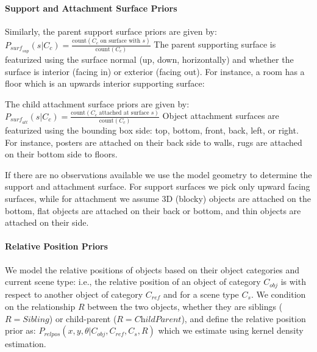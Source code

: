 \documentclass{sigchi}
\begin{document}
\paragraph{Support and Attachment Surface Priors}
Similarly, the parent support surface priors are given by: $P_{\textit{surf}_\textit{sup}}(s | C_c) = \frac{\text{count}(C_c \text{~on surface with~} s)}{\text{count}(C_c)}$
The parent supporting surface is featurized using the surface normal (up, down, horizontally) and whether the surface is interior (facing in) or exterior (facing out).  For instance, a room has a floor which is an upwards interior supporting surface: %

The child attachment surface priors are given by: $P_{\textit{surf}_\textit{att}}(s | C_c) = \frac{\text{count}(C_c \text{~attached at surface~} s)}{\text{count}(C_c)}$
Object attachment surfaces are featurized using the bounding box side: top, bottom, front, back, left, or right.  For instance, posters are attached on their back side to walls, rugs are attached on their bottom side to floors.

If there are no observations available we use the model geometry to determine the support and attachment surface. For support surfaces we pick only upward facing surfaces, while for attachment we assume 3D (blocky) objects are attached on the bottom, flat objects are attached on their back or bottom, and thin objects are attached on their side.

\paragraph{Relative Position Priors}
We model the relative positions of objects based on their object categories and current scene type: i.e., the relative position of an object of category $C_\textit{obj}$ is with respect to another object of category $C_\textit{ref}$ and for a scene type $C_{s}$.  We condition on the relationship $R$ between the two objects, whether they are siblings ($R=\textit{Sibling}$) or child-parent ($R=\textit{ChildParent}$), and define the relative position prior as: $P_\textit{relpos}( x,y,\theta | C_\textit{obj}, C_\textit{ref}, C_{s}, R )$ which we estimate using kernel density estimation.
\end{document}
